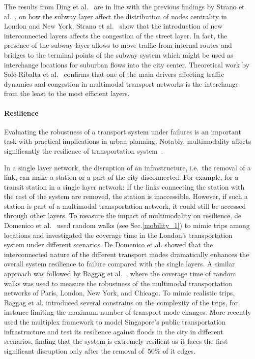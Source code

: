 The results from Ding et al.~\cite{ding2018traffic} are in line with the previous findings by Strano et al.~\cite{strano2015features}, on how the subway layer affect the distribution of nodes centrality in London and New York. Strano et al.~\cite{strano2015features} show that the introduction of new interconnected layers affects the congestion of the street layer. In fact, the presence of the subway layer allows to move traffic from internal routes and bridges to the terminal points of the subway system which might be used as interchange locations for suburban flows into the city center. Theoretical work by Sol\'{e}-Ribalta et al.~\cite{sole-ribalta2016congestion} confirms that one of the main drivers affecting traffic dynamics and congestion in multimodal transport networks is the interchange from the least to the most efficient layers.

\paragraph*{Resilience}
Evaluating the robustness of a transport system under failures is an important task with practical implications in urban planning. Notably, multimodality affects significantly the resilience of transportation system~\cite{dedomenico2014interconnected}.

In a single layer network, the disruption of an infrastructure, i.e.~the removal of a link, can make a station or a part of the city disconnected. For example, for a transit station in a single layer network: If the links connecting the station with the rest of the system are removed, the station is inaccessible. However, if such a station is part of a multimodal transportation network, it could still be accessed through other layers. To measure the impact of multimodality on resilience, de Domenico et al.~\cite{dedomenico2014interconnected} used random walks (see Sec.\ref{mobility_1}) to mimic trips among locations and investigated the coverage time in the London's transportation system under different scenarios. De Domenico et al. showed that the interconnected nature of the different transport modes dramatically enhances the overall system resilience to failure compared with the single layers. A similar approach was followed by Baggag et al.~\cite{baggag2018resilience}, where the coverage time of random walks was used to measure the robustness of the multimodal transportation networks of Paris, London, New York, and Chicago. To mimic realistic trips, Baggag et al. introduced several constrains on the complexity of the trips, for instance limiting the maximum number of transport mode changes. More recently \cite{ferretti2019resilience} used the multiplex framework to model Singapore's public transportation infrastructure and test its resilience against floods in the city in different scenarios, finding that the system is extremely resilient as it faces the first significant disruption only after the removal of $~50\%$ of it edges.

